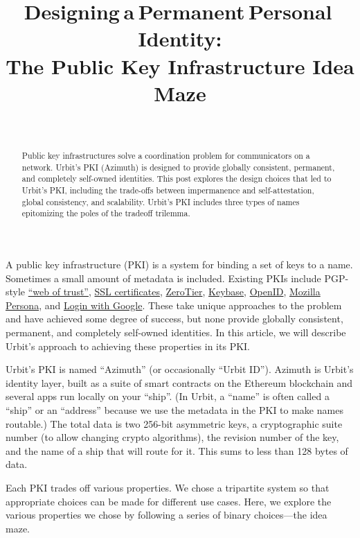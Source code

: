 \documentclass[twoside]{article}
\title{Designing a Permanent Personal Identity: \\ The Public Key Infrastructure Idea Maze}
\author{\authorname~\authorpatp \\ \affiliation}
\date{}
\begin{document}
\maketitle
\thispagestyle{firststyle}

\begin{abstract}
Public key infrastructures solve a coordination problem for communicators on a network. Urbit's PKI (Azimuth) is designed to provide globally consistent, permanent, and completely self-owned identities. This post explores the design choices that led to Urbit's PKI, including the trade-offs between impermanence and self-attestation, global consistency, and scalability. Urbit's PKI includes three types of names epitomizing the poles of the tradeoff trilemma.
\end{abstract}

\setcounter{page}{1}


A public key infrastructure (PKI) is a system for binding a set of keys to a name. Sometimes a small amount of metadata is included. Existing PKIs include PGP-style
\href{https://en.wikipedia.org/wiki/Web_of_trust}{``web of trust''},
\href{https://en.wikipedia.org/wiki/Certificate_authority}{SSL
certificates},
\href{https://www.zerotier.com/lf-announcement/}{ZeroTier},
\href{https://keybase.io/}{Keybase},
\href{https://openid.net/what-is-openid/}{OpenID},
\href{https://developer.mozilla.org/en-US/docs/Archive/Mozilla/Persona}{Mozilla
Persona}, and \href{https://developers.google.com/identity}{Login with
Google}. These take unique approaches to the problem and have achieved
some degree of success, but none provide globally consistent, permanent,
and completely self-owned identities. In this article, we will describe Urbit's approach to achieving these properties in its PKI.

Urbit's PKI is named ``Azimuth'' (or occasionally ``Urbit ID'').  Azimuth is Urbit's identity layer, built as a suite of smart contracts on the Ethereum blockchain and several apps run locally on your ``ship''. (In Urbit, a ``name'' is often called a ``ship'' or an ``address''
because we use the metadata in the PKI to make names routable.) The total
data is two 256-bit asymmetric keys, a cryptographic suite number (to
allow changing crypto algorithms), the revision number of the key, and
the name of a ship that will route for it. This sums to less than 128
bytes of data.

Each PKI trades off various properties. We chose a tripartite system so
that appropriate choices can be made for different use cases. Here, we
explore the various properties we chose by following a series of binary
choices—the idea maze.
\end{document}
